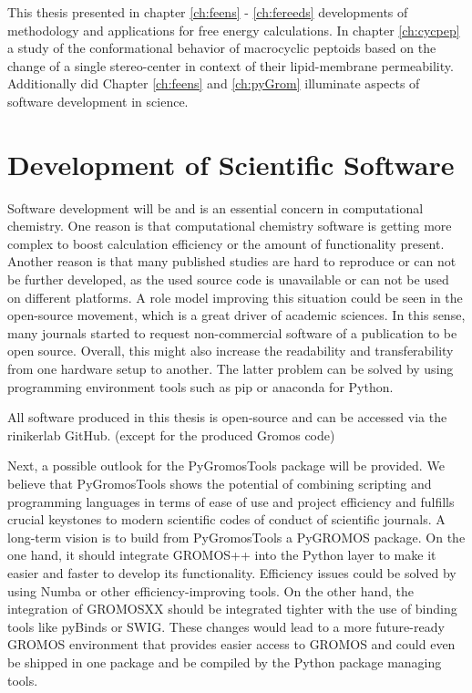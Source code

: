 
This thesis presented in chapter \ref{ch:feens} - \ref{ch:fereeds} developments of methodology and applications for free energy calculations. In chapter \ref{ch:cycpep} a study of the conformational behavior of macrocyclic peptoids  based on the change of a single stereo-center in context of their lipid-membrane permeability. Additionally did Chapter \ref{ch:feens} and \ref{ch:pyGrom} illuminate aspects of software development in science.

\section{Development of Scientific Software}
Software development will be and is an essential concern in computational chemistry.  One reason is that computational chemistry software is getting more complex to boost calculation efficiency or the amount of functionality present. Another reason is that many published studies are hard to reproduce or can not be further developed, as the used source code is unavailable or can not be used on different platforms.\cite{Walters2013, Walters2020} A role model improving this situation could be seen in the open-source movement, which is a great driver of academic sciences.\cite{Walters2020, Oliphant2007} In this sense, many journals started to request non-commercial software of a publication to be open source. \cite{Jcconduct2021, Scienceconduct2021, Natureconduct2021}  Overall, this might also increase the readability and transferability from one hardware setup to another.\cite{Walters2020} The latter problem can be solved by using programming environment tools such as pip or anaconda for Python. \cite{Anaconda2020, Pypi2021}

All software produced in this thesis is open-source and can be accessed via the rinikerlab GitHub. (except for the produced Gromos code)

Next, a possible outlook for the PyGromosTools package will be provided. We believe that PyGromosTools shows the potential of combining scripting and programming languages in terms of ease of use and project efficiency and fulfills crucial keystones to modern scientific codes of conduct of scientific journals. 
A long-term vision is to build from PyGromosTools a PyGROMOS package. On the one hand, it should integrate GROMOS++ \cite{Eichenberger2011} into the Python layer to make it easier and faster to develop its functionality. Efficiency issues could be solved by using Numba or other efficiency-improving tools. On the other hand, the integration of GROMOSXX \cite{Schmid2012} should be integrated tighter with the use of binding tools like pyBinds or SWIG. \cite{Wenzel2011, Beazley1996} These changes would lead to a more future-ready GROMOS environment that provides easier access to GROMOS and could even be shipped in one package and be compiled by the Python package managing tools. 


